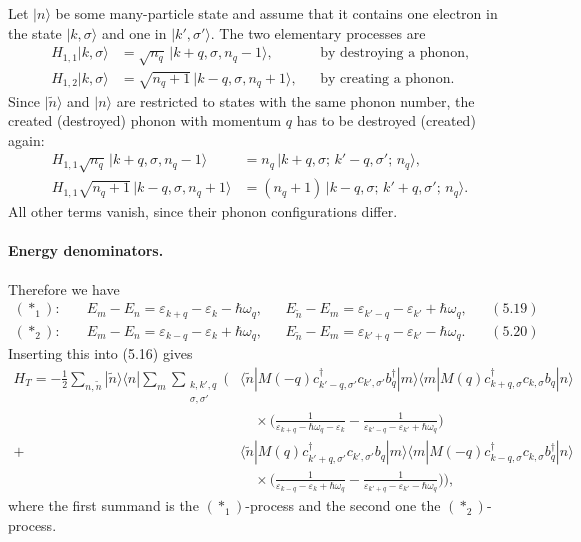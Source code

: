 \documentclass[../../main.tex]{subfiles}
\begin{document}
Let $|n\rangle$ be some many-particle state and assume that it contains one electron in
the state $|k,\sigma\rangle$ and one in $|k',\sigma'\rangle$. The two elementary
processes are
\begin{align}
H_{1,1}|k,\sigma\rangle &= \sqrt{n_q}\,|k+q,\sigma,n_q-1\rangle,
  &&\text{by destroying a phonon,} \tag{$\ast_1$}\\
H_{1,2}|k,\sigma\rangle &= \sqrt{n_q+1}\,|k-q,\sigma,n_q+1\rangle,
  &&\text{by creating a phonon.} \tag{$\ast_2$}
\end{align}
Since $|\tilde n\rangle$ and $|n\rangle$ are restricted to states with the same phonon
number, the created (destroyed) phonon with momentum $q$ has to be destroyed (created)
again:
\begin{align}
H_{1,1}\sqrt{n_q}\,|k+q,\sigma,n_q-1\rangle
  &= n_q\,|k+q,\sigma;\,k'-q,\sigma';\,n_q\rangle,\\
H_{1,1}\sqrt{n_q+1}\,|k-q,\sigma,n_q+1\rangle
  &= (n_q+1)\,|k-q,\sigma;\,k'+q,\sigma';\,n_q\rangle.
\end{align}
All other terms vanish, since their phonon configurations differ.

\paragraph{Energy denominators.}
Therefore we have
\begin{align}
(\ast_1):&\quad E_m-E_n=\varepsilon_{k+q}-\varepsilon_k-\hbar\omega_q,
  &&E_{\tilde n}-E_m=\varepsilon_{k'-q}-\varepsilon_{k'}+\hbar\omega_q,
  &&(5.19)\\
(\ast_2):&\quad E_m-E_n=\varepsilon_{k-q}-\varepsilon_k+\hbar\omega_q,
  &&E_{\tilde n}-E_m=\varepsilon_{k'+q}-\varepsilon_{k'}-\hbar\omega_q.
  &&(5.20)
\end{align}
Inserting this into (5.16) gives
\begin{equation}
\begin{split}
H_T=-\frac{1}{2}\sum_{n,\tilde n}|\tilde n\rangle\langle n|\sum_m
\sum_{\substack{k,k',q\\ \sigma,\sigma'}}\Big(&
\langle\tilde n|M(-q)c^\dagger_{k'-q,\sigma'}c_{k',\sigma'}b^\dagger_q|m\rangle
\langle m|M(q)c^\dagger_{k+q,\sigma}c_{k,\sigma}b_q|n\rangle\\
&\quad\times\Big(\frac{1}{\varepsilon_{k+q}-\hbar\omega_q-\varepsilon_k}
-\frac{1}{\varepsilon_{k'-q}-\varepsilon_{k'}+\hbar\omega_q}\Big)\\
+\;&\langle\tilde n|M(q)c^\dagger_{k'+q,\sigma'}c_{k',\sigma'}b_q|m\rangle
\langle m|M(-q)c^\dagger_{k-q,\sigma}c_{k,\sigma}b^\dagger_q|n\rangle\\
&\quad\times\Big(\frac{1}{\varepsilon_{k-q}-\varepsilon_k+\hbar\omega_q}
-\frac{1}{\varepsilon_{k'+q}-\varepsilon_{k'}-\hbar\omega_q}\Big)\Big),
\end{split}
\end{equation}
where the first summand is the $(\ast_1)$-process and the second one the
$(\ast_2)$-process.
\end{document}
